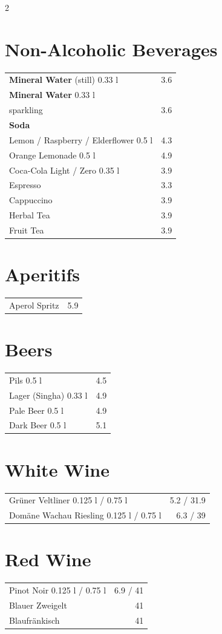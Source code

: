 \documentclass[a4paper,12pt]{article}
\begin{document}
\begin{multicols}{2}

\section*{Non-Alcoholic Beverages}
\begin{tabular}{p{6cm}r}
\textbf{Mineral Water} {\scriptsize (still)} 0.33 l & 3.6\\
\textbf{Mineral Water} 0.33 l \\
\scriptsize sparkling & 3.6\\
\textbf{Soda}\\
Lemon / Raspberry / Elderflower 0.5 l & 4.3\\
Orange Lemonade 0.5 l & 4.9\\
Coca-Cola Light / Zero 0.35 l & 3.9\\
Espresso & 3.3\\
Cappuccino & 3.9\\
Herbal Tea & 3.9\\
Fruit Tea & 3.9
\end{tabular}

\section*{Aperitifs}
\begin{tabular}{p{6cm}r}
Aperol Spritz & 5.9
\end{tabular}

\section*{Beers}
\begin{tabular}{p{6cm}r}
Pils 0.5 l & 4.5\\
Lager (Singha) 0.33 l & 4.9\\
Pale Beer 0.5 l & 4.9\\
Dark Beer 0.5 l & 5.1
\end{tabular}

\section*{White Wine}
\begin{tabular}{p{6cm}r}
Grüner Veltliner 0.125 l / 0.75 l & 5.2 / 31.9\\
Domäne Wachau Riesling 0.125 l / 0.75 l & 6.3 / 39
\end{tabular}

\section*{Red Wine}
\begin{tabular}{p{6cm}r}
Pinot Noir 0.125 l / 0.75 l & 6.9 / 41\\
Blauer Zweigelt & 41\\
Blaufränkisch & 41
\end{tabular}


\end{multicols}
\end{document}
